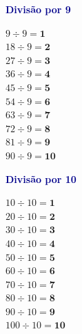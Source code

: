 \documentclass[12pt]{article}
\begin{document}
\begin{minipage}[t]{3.3cm}
\noindent\textcolor{darkblue}{\bfseries\small Divisão por 9}\par\vspace{2pt}
{\footnotesize
$9\div9=\mathbf{1}$\\$18\div9=\mathbf{2}$\\$27\div9=\mathbf{3}$\\
$36\div9=\mathbf{4}$\\$45\div9=\mathbf{5}$\\$54\div9=\mathbf{6}$\\
$63\div9=\mathbf{7}$\\$72\div9=\mathbf{8}$\\$81\div9=\mathbf{9}$\\
$90\div9=\mathbf{10}$}
\end{minipage}\hfill
\begin{minipage}[t]{3.3cm}
\noindent\textcolor{darkblue}{\bfseries\small Divisão por 10}\par\vspace{2pt}
{\footnotesize
$10\div10=\mathbf{1}$\\$20\div10=\mathbf{2}$\\$30\div10=\mathbf{3}$\\
$40\div10=\mathbf{4}$\\$50\div10=\mathbf{5}$\\$60\div10=\mathbf{6}$\\
$70\div10=\mathbf{7}$\\$80\div10=\mathbf{8}$\\$90\div10=\mathbf{9}$\\
$100\div10=\mathbf{10}$}
\end{minipage}
\end{document}
